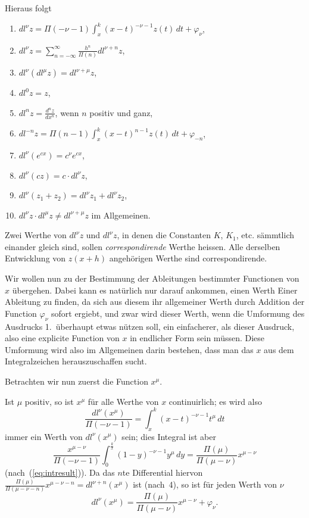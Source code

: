 \documentclass[12pt,a4paper]{article}
\begin{document}
Hieraus folgt
\begin{enumerate}
\item[$1$.] $dl^\nu z = \Pi(-\nu-1) \int_x^k (x-t)^{-\nu-1}z(t)\,dt + \varphi_\nu$,
\item[$2$.] $dl^\nu z = \sum_{n=-\infty}^{\infty} \frac{h^n}{\Pi(n)} dl^{\nu+n} z$,
\item[$3$.] $dl^\nu(dl^\mu z) = dl^{\nu+\mu}z$,
\item[$4$.] $dl^0 z = z$,
\item[$5$.] $dl^n z = \frac{d^n z}{dx^n}$, wenn $n$ positiv und ganz,
\item[$6$.] $dl^{-n} z = \Pi(n-1) \int_x^k (x-t)^{n-1}z(t)\,dt + \varphi_{-n}$,
\item[$7$.] $dl^\nu(e^{cx}) = c^\nu e^{cx}$,
\item[$8$.] $dl^\nu(cz) = c \cdot dl^\nu z$,
\item[$9$.] $dl^\nu(z_1 + z_2) = dl^\nu z_1 + dl^\nu z_2$,
\item[$10$.] $dl^\nu z \cdot dl^\mu z \neq dl^{\nu+\mu}z$ im Allgemeinen.
\end{enumerate}
Zwei Werthe von $dl^\nu z$ und $dl^\nu z$, in denen die Constanten $K$, $K_1$, etc. s\"ammtlich einander gleich sind, sollen \emph{correspondirende} Werthe heissen. Alle derselben Entwicklung von $z(x+h)$ angeh\"origen Werthe sind correspondirende.

Wir wollen nun zu der Bestimmung der Ableitungen bestimmter Functionen von $x$ \"ubergehen. Dabei kann es nat\"urlich nur darauf ankommen, einen Werth Einer Ableitung zu finden, da sich aus diesem ihr allgemeiner Werth durch Addition der Function $\varphi_\nu$ sofort ergiebt, und zwar wird dieser Werth, wenn die Umformung des Ausdrucks 1.\ \"uberhaupt etwas n\"utzen soll, ein einfacherer, als dieser Ausdruck, also eine explicite Function von $x$ in endlicher Form sein m\"ussen. Diese Umformung wird also im Allgemeinen darin bestehen, dass man das $x$ aus dem Integralzeichen herauszuschaffen sucht.

Betrachten wir nun zuerst die Function $x^\mu$.

Ist $\mu$ positiv, so ist $x^\mu$ f\"ur alle Werthe von $x$ continuirlich; es wird also
\[
\frac{dl^\nu(x^\mu)}{\Pi(-\nu-1)} = \int_x^k (x-t)^{-\nu-1}t^\mu\,dt
\]
immer ein Werth von $dl^\nu(x^\mu)$ sein; dies Integral ist aber
\[
\frac{x^{\mu-\nu}}{\Pi(-\nu-1)} \int_0^{\frac{k}{x}}(1-y)^{-\nu-1}y^\mu\,dy = \frac{\Pi(\mu)}{\Pi(\mu-\nu)}x^{\mu-\nu}
\]
(nach~(\ref{eq:intresult})). Da das $n$te Differential hiervon $\frac{\Pi(\mu)}{\Pi(\mu-\nu-n)}x^{\mu-\nu-n} = dl^{\nu+n}(x^\mu)$ ist (nach~4), so ist f\"ur jeden Werth von $\nu$
\begin{equation}
dl^\nu(x^\mu) = \frac{\Pi(\mu)}{\Pi(\mu-\nu)}x^{\mu-\nu} + \varphi_\nu.
\end{equation}
\end{document}
